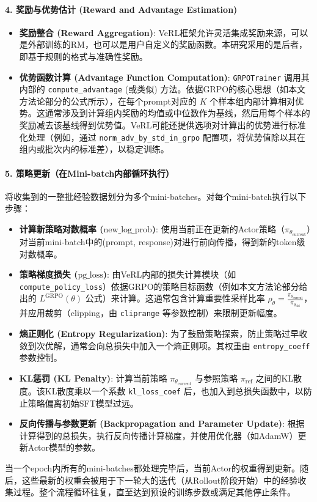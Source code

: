 \documentclass{pkuthesis}
\begin{document}
\paragraph{4. 奖励与优势估计 (Reward and Advantage Estimation)}
\begin{itemize}
    \item \textbf{奖励整合 (Reward Aggregation)}: VeRL框架允许灵活集成奖励来源，可以是外部训练的RM，也可以是用户自定义的奖励函数。本研究采用的是后者，即基于规则的格式与准确性奖励。
    \item \textbf{优势函数计算 (Advantage Function Computation)}: \texttt{GRPOTrainer} 调用其内部的 \texttt{compute\_advantage} (或类似) 方法。依据GRPO的核心思想（如本文方法论部分的公式所示），在每个prompt对应的 $K$ 个样本组内部计算相对优势。这通常涉及到计算组内奖励的均值或中位数作为基线，然后用每个样本的奖励减去该基线得到优势值。VeRL可能还提供选项对计算出的优势进行标准化处理（例如，通过 \texttt{norm\_adv\_by\_std\_in\_grpo} 配置项，将优势值除以其在组内或批次内的标准差），以稳定训练。
\end{itemize}

\paragraph{5. 策略更新（在Mini-batch内部循环执行）}
将收集到的一整批经验数据划分为多个mini-batches。对每个mini-batch执行以下步骤：
\begin{itemize}
    \item \textbf{计算新策略对数概率 ($\text{new\_log\_prob}$)}: 使用当前正在更新的Actor策略（$\pi_{\theta_{\text{current}}}$）对当前mini-batch中的(prompt, response)对进行前向传播，得到新的token级对数概率。
    \item \textbf{策略梯度损失 ($\text{pg\_loss}$)}: 由VeRL内部的损失计算模块（如 \texttt{compute\_policy\_loss}）依据GRPO的策略目标函数（例如本文方法论部分给出的 $L^{\text{GRPO}}(\theta)$ 公式）来计算。这通常包含计算重要性采样比率 $\rho_{\theta} = \frac{\pi_{\theta_{\text{current}}}}{\pi_{\theta_{\text{old}}}}$，并应用裁剪（clipping，由 \texttt{cliprange} 等参数控制）来限制更新幅度。
    \item \textbf{熵正则化 (Entropy Regularization)}: 为了鼓励策略探索，防止策略过早收敛到次优解，通常会向总损失中加入一个熵正则项。其权重由 \texttt{entropy\_coeff} 参数控制。
    \item \textbf{KL惩罚 (KL Penalty)}: 计算当前策略 $\pi_{\theta_{\text{current}}}$ 与参照策略 $\pi_{\text{ref}}$ 之间的KL散度。该KL散度乘以一个系数 \texttt{kl\_loss\_coef} 后，也加入到总损失函数中，以防止策略偏离初始SFT模型过远。
    \item \textbf{反向传播与参数更新 (Backpropagation and Parameter Update)}: 根据计算得到的总损失，执行反向传播计算梯度，并使用优化器（如AdamW）更新Actor模型的参数。
\end{itemize}
当一个epoch内所有的mini-batches都处理完毕后，当前Actor的权重得到更新。随后，这些最新的权重会被用于下一轮大的迭代（从Rollout阶段开始）中的经验收集过程。整个流程循环往复，直至达到预设的训练步数或满足其他停止条件。
\end{document}
